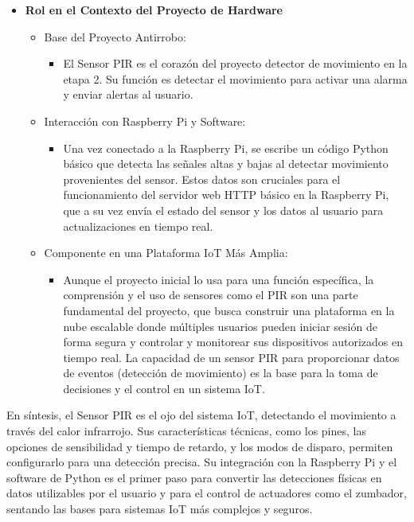 \documentclass{report}
\begin{document}
\begin{itemize}
    \item \textbf{Rol en el Contexto del Proyecto de Hardware}
    \begin{itemize}
        \item Base del Proyecto Antirrobo:
        \begin{itemize}
            \item El Sensor PIR es el corazón del proyecto detector de movimiento en la etapa 2. Su función es 
            detectar el movimiento para activar una alarma y enviar alertas al usuario.
        \end{itemize}
        \item Interacción con Raspberry Pi y Software:
        \begin{itemize}
            \item Una vez conectado a la Raspberry Pi, se escribe un código Python básico que detecta las señales altas y bajas al detectar movimiento 
            provenientes del sensor. Estos datos son cruciales para el funcionamiento del servidor web HTTP básico en la Raspberry Pi, que a su vez envía 
            el estado del sensor y los datos al usuario para actualizaciones en tiempo real.
        \end{itemize}
        \item Componente en una Plataforma IoT Más Amplia:
        \begin{itemize}
            \item Aunque el proyecto inicial lo usa para una función específica, la comprensión y el uso de sensores como el PIR son una parte fundamental 
            del proyecto, que busca construir una plataforma en la nube escalable donde múltiples usuarios pueden iniciar sesión de forma segura y controlar 
            y monitorear sus dispositivos autorizados en tiempo real. La capacidad de un sensor PIR para proporcionar datos de eventos (detección de 
            movimiento) es la base para la toma de decisiones y el control en un sistema IoT.
        \end{itemize}
    \end{itemize}
\end{itemize}
En síntesis, el Sensor PIR es el ojo del sistema IoT, detectando el movimiento a través del calor infrarrojo. Sus características técnicas, 
como los pines, las opciones de sensibilidad y tiempo de retardo, y los modos de disparo, permiten configurarlo para una detección precisa. Su integración 
con la Raspberry Pi y el software de Python es el primer paso para convertir las detecciones físicas en datos utilizables por el usuario y para el control 
de actuadores como el zumbador, sentando las bases para sistemas IoT más complejos y seguros.
\end{document}

